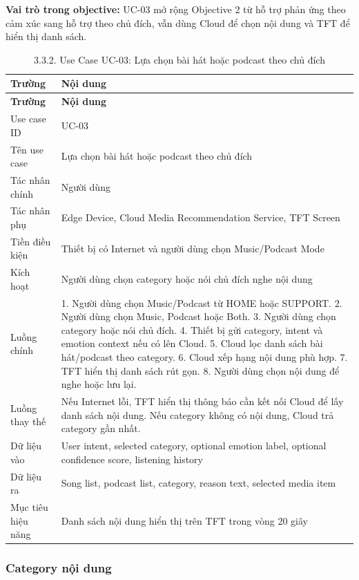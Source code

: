 \documentclass[12pt,a4paper]{article}
\begin{document}
\textbf{Vai trò trong objective:} UC-03 mở rộng Objective 2 từ hỗ trợ phản ứng theo cảm xúc sang hỗ trợ theo chủ đích, vẫn dùng Cloud để chọn nội dung và TFT để hiển thị danh sách.


\begin{center}
\begin{longtable}{|P{0.30\textwidth}|P{0.62\textwidth}|}
\caption{3.3.2. Use Case UC-03: Lựa chọn bài hát hoặc podcast theo chủ đích}\\
\hline
\textbf{Trường} & \textbf{Nội dung} \\
\hline
\endfirsthead
\hline
\textbf{Trường} & \textbf{Nội dung} \\
\hline
\endhead
Use case ID & UC-03 \\
\hline
Tên use case & Lựa chọn bài hát hoặc podcast theo chủ đích \\
\hline
Tác nhân chính & Người dùng \\
\hline
Tác nhân phụ & Edge Device, Cloud Media Recommendation Service, TFT Screen \\
\hline
Tiền điều kiện & Thiết bị có Internet và người dùng chọn Music/Podcast Mode \\
\hline
Kích hoạt & Người dùng chọn category hoặc nói chủ đích nghe nội dung \\
\hline
Luồng chính & 1. Người dùng chọn Music/Podcast từ HOME hoặc SUPPORT. 2. Người dùng chọn Music, Podcast hoặc Both. 3. Người dùng chọn category hoặc nói chủ đích. 4. Thiết bị gửi category, intent và emotion context nếu có lên Cloud. 5. Cloud lọc danh sách bài hát/podcast theo category. 6. Cloud xếp hạng nội dung phù hợp. 7. TFT hiển thị danh sách rút gọn. 8. Người dùng chọn nội dung để nghe hoặc lưu lại. \\
\hline
Luồng thay thế & Nếu Internet lỗi, TFT hiển thị thông báo cần kết nối Cloud để lấy danh sách nội dung. Nếu category không có nội dung, Cloud trả category gần nhất. \\
\hline
Dữ liệu vào & User intent, selected category, optional emotion label, optional confidence score, listening history \\
\hline
Dữ liệu ra & Song list, podcast list, category, reason text, selected media item \\
\hline
Mục tiêu hiệu năng & Danh sách nội dung hiển thị trên TFT trong vòng 20 giây \\
\hline
\end{longtable}
\end{center}

\subsubsection*{Category nội dung}
\end{document}
